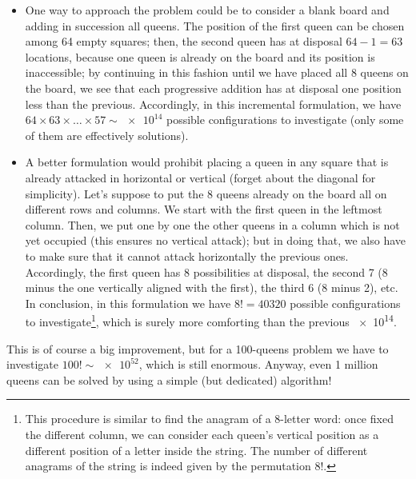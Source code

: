 \begin{itemize}
\item One way to approach the problem could be to consider a blank board and adding in succession all queens. The position of the first queen can be chosen among 64 empty squares; then, the second queen has at disposal $64-1=63$ locations, because one queen is already on the board and its position is inaccessible; by continuing in this fashion until we have placed all 8 queens on the board, we see that each progressive addition has at disposal one position less than the previous. Accordingly, in this incremental formulation, we have $64\times63\times\ldots\times57\sim\num{e14}$ possible configurations to investigate (only some of them are effectively solutions).
\item A better formulation would prohibit placing a queen in any square that is already attacked in horizontal or vertical (forget about the diagonal for simplicity). Let's suppose to put the 8 queens already on the board all on different rows and columns. We start with the first queen in the leftmost column. Then, we put one by one the other queens in a column which is not yet occupied (this ensures no vertical attack); but in doing that, we also have to make sure that it cannot attack horizontally the previous ones. Accordingly, the first queen has 8 possibilities at disposal, the second 7 (8 minus the one vertically aligned with the first), the third 6 (8 minus 2), etc. In conclusion, in this formulation we have $8!=40320$ possible configurations to investigate\footnote{This procedure is similar to find the anagram of a 8-letter word: once fixed the different column, we can consider each queen's vertical position as a different position of a letter inside the string. The number of different anagrams of the string is indeed given by the permutation $8!$.}, which is surely more comforting than the previous \num{e14}.
\end{itemize}
This is of course a big improvement, but for a 100-queens problem we have to investigate $100!\sim\num{e52}$, which is still enormous. Anyway, even 1 million queens can be solved by using a simple (but dedicated) algorithm!
